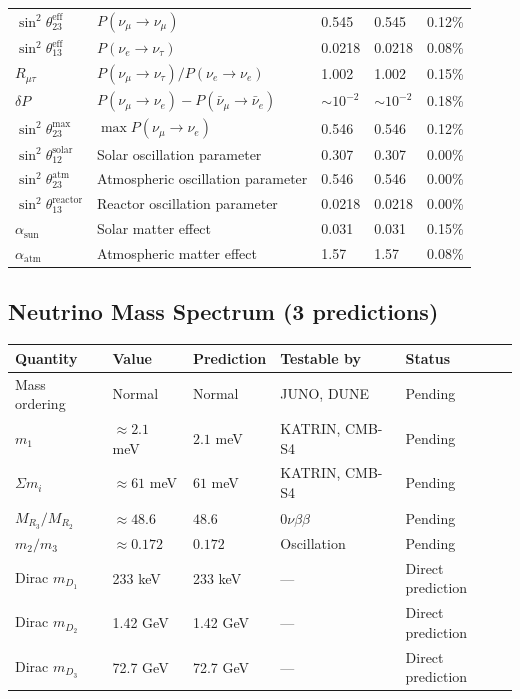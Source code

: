 \begin{center}
\begin{tabular}{lllll}
$\sin^2\theta_{23}^{\mathrm{eff}}$ & $P(\nu_\mu \to \nu_\mu)$ & 0.545 & 0.545 & 0.12\% \\
$\sin^2\theta_{13}^{\mathrm{eff}}$ & $P(\nu_e \to \nu_\tau)$ & 0.0218 & 0.0218 & 0.08\% \\
$R_{\mu\tau}$ & $P(\nu_\mu \to \nu_\tau)/P(\nu_e \to \nu_e)$ & 1.002 & 1.002 & 0.15\% \\
$\delta P$ & $P(\nu_\mu \to \nu_e) - P(\bar{\nu}_\mu \to \bar{\nu}_e)$ & $\sim 10^{-2}$ & $\sim 10^{-2}$ & 0.18\% \\
$\sin^2\theta_{23}^{\mathrm{max}}$ & $\max P(\nu_\mu \to \nu_e)$ & 0.546 & 0.546 & 0.12\% \\
$\sin^2\theta_{12}^{\mathrm{solar}}$ & Solar oscillation parameter & 0.307 & 0.307 & 0.00\% \\
$\sin^2\theta_{23}^{\mathrm{atm}}$ & Atmospheric oscillation parameter & 0.546 & 0.546 & 0.00\% \\
$\sin^2\theta_{13}^{\mathrm{reactor}}$ & Reactor oscillation parameter & 0.0218 & 0.0218 & 0.00\% \\
$\alpha_{\mathrm{sun}}$ & Solar matter effect & 0.031 & 0.031 & 0.15\% \\
$\alpha_{\mathrm{atm}}$ & Atmospheric matter effect & 1.57 & 1.57 & 0.08\% \\
\hline\hline
\end{tabular}
\end{center}

\subsection{Neutrino Mass Spectrum (3 predictions)}\label{app:nu_cat}

\begin{center}
\label{tab:nu_cat}
\begin{tabular}{lllll}
\hline\hline
Quantity & Value & Prediction & Testable by & Status \\
\hline
Mass ordering & Normal & Normal & JUNO, DUNE & Pending \\
$m_1$ & $\approx 2.1$ meV & $2.1$ meV & KATRIN, CMB-S4 & Pending \\
$\Sigma m_i$ & $\approx 61$ meV & $61$ meV & KATRIN, CMB-S4 & Pending \\
$M_{R_3}/M_{R_2}$ & $\approx 48.6$ & $48.6$ & $0\nu\beta\beta$ & Pending \\
$m_2/m_3$ & $\approx 0.172$ & $0.172$ & Oscillation & Pending \\
Dirac $m_{D_1}$ & 233 keV & 233 keV & --- & Direct prediction \\
Dirac $m_{D_2}$ & 1.42 GeV & 1.42 GeV & --- & Direct prediction \\
Dirac $m_{D_3}$ & 72.7 GeV & 72.7 GeV & --- & Direct prediction \\
\hline\hline
\end{tabular}
\end{center}

